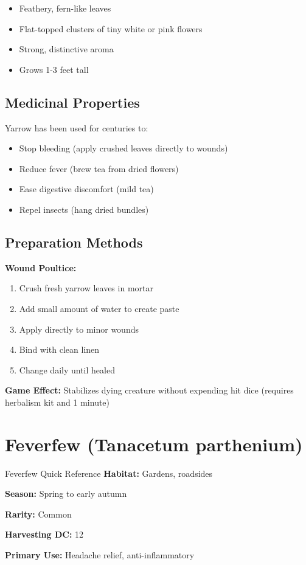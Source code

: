 \documentclass[letterpaper,twocolumn,openany]{dndbook}
\begin{document}
\begin{itemize}
    \item Feathery, fern-like leaves
    \item Flat-topped clusters of tiny white or pink flowers
    \item Strong, distinctive aroma
    \item Grows 1-3 feet tall
\end{itemize}

\subsection{Medicinal Properties}

Yarrow has been used for centuries to:

\begin{itemize}
    \item Stop bleeding (apply crushed leaves directly to wounds)
    \item Reduce fever (brew tea from dried flowers)
    \item Ease digestive discomfort (mild tea)
    \item Repel insects (hang dried bundles)
\end{itemize}

\subsection{Preparation Methods}

\textbf{Wound Poultice:}
\begin{enumerate}
    \item Crush fresh yarrow leaves in mortar
    \item Add small amount of water to create paste
    \item Apply directly to minor wounds
    \item Bind with clean linen
    \item Change daily until healed
\end{enumerate}

\textbf{Game Effect:} Stabilizes dying creature without expending hit dice (requires herbalism kit and 1 minute)

\section{Feverfew (Tanacetum parthenium)}

\begin{DndSidebar}{Feverfew Quick Reference}
    \textbf{Habitat:} Gardens, roadsides

    \textbf{Season:} Spring to early autumn

    \textbf{Rarity:} Common

    \textbf{Harvesting DC:} 12

    \textbf{Primary Use:} Headache relief, anti-inflammatory
\end{DndSidebar}
\end{document}
